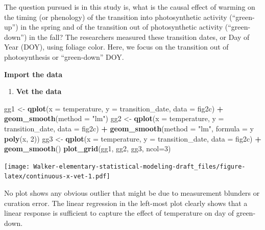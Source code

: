 \documentclass[]{book}
\newenvironment{Shaded}{\begin{snugshade}}{\end{snugshade}}
\newcommand{\DataTypeTok}[1]{\textcolor[rgb]{0.13,0.29,0.53}{#1}}
\newcommand{\DecValTok}[1]{\textcolor[rgb]{0.00,0.00,0.81}{#1}}
\newcommand{\KeywordTok}[1]{\textcolor[rgb]{0.13,0.29,0.53}{\textbf{#1}}}
\newcommand{\NormalTok}[1]{#1}
\newcommand{\OperatorTok}[1]{\textcolor[rgb]{0.81,0.36,0.00}{\textbf{#1}}}
\newcommand{\StringTok}[1]{\textcolor[rgb]{0.31,0.60,0.02}{#1}}
\providecommand{\tightlist}{%
  \setlength{\itemsep}{0pt}\setlength{\parskip}{0pt}}
\begin{document}
The question pursued is in this study is, what is the causal effect of warming on the timing (or phenology) of the transition into photosynthetic activity (``green-up'') in the spring and of the transition out of photosynthetic activity (``green-down'') in the fall? The researchers measured these transition dates, or Day of Year (DOY), using foliage color. Here, we focus on the transition out of photosynthesis or ``green-down'' DOY.

\textbf{Import the data}

\begin{enumerate}
\def\labelenumi{\arabic{enumi}.}
\tightlist
\item
  \textbf{Vet the data}
\end{enumerate}

\begin{Shaded}
\begin{Highlighting}[]
\NormalTok{gg1 <-}\StringTok{ }\KeywordTok{qplot}\NormalTok{(}\DataTypeTok{x =}\NormalTok{ temperature,}
      \DataTypeTok{y =}\NormalTok{ transition_date,}
      \DataTypeTok{data =}\NormalTok{ fig2c) }\OperatorTok{+}
\StringTok{  }\KeywordTok{geom_smooth}\NormalTok{(}\DataTypeTok{method =} \StringTok{"lm"}\NormalTok{)}
\NormalTok{gg2 <-}\StringTok{ }\KeywordTok{qplot}\NormalTok{(}\DataTypeTok{x =}\NormalTok{ temperature,}
      \DataTypeTok{y =}\NormalTok{ transition_date,}
      \DataTypeTok{data =}\NormalTok{ fig2c) }\OperatorTok{+}
\StringTok{  }\KeywordTok{geom_smooth}\NormalTok{(}\DataTypeTok{method =} \StringTok{"lm"}\NormalTok{, }\DataTypeTok{formula =}\NormalTok{ y }\OperatorTok{~}\StringTok{ }\KeywordTok{poly}\NormalTok{(x, }\DecValTok{2}\NormalTok{))}
\NormalTok{gg3 <-}\StringTok{ }\KeywordTok{qplot}\NormalTok{(}\DataTypeTok{x =}\NormalTok{ temperature,}
      \DataTypeTok{y =}\NormalTok{ transition_date,}
      \DataTypeTok{data =}\NormalTok{ fig2c) }\OperatorTok{+}
\StringTok{  }\KeywordTok{geom_smooth}\NormalTok{()}
\KeywordTok{plot_grid}\NormalTok{(gg1, gg2, gg3, }\DataTypeTok{ncol=}\DecValTok{3}\NormalTok{)}
\end{Highlighting}
\end{Shaded}

\texttt{[image: Walker-elementary-statistical-modeling-draft\_files/figure-latex/continuous-x-vet-1.pdf]}

No plot shows any obvious outlier that might be due to measurement blunders or curation error. The linear regression in the left-most plot clearly shows that a linear response is sufficient to capture the effect of temperature on day of green-down.
\end{document}
